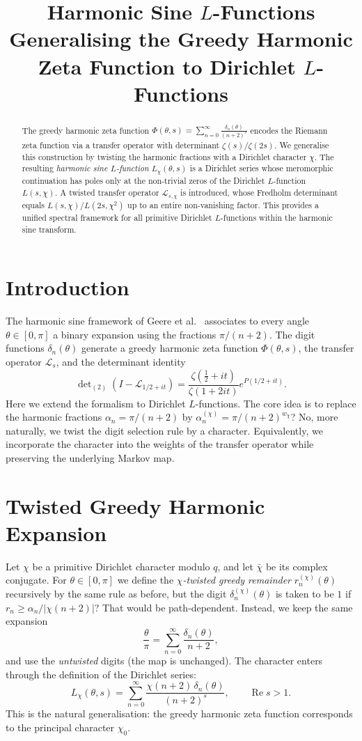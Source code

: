 \documentclass[11pt,a4paper]{article}
\title{\bfseries Harmonic Sine \(L\)-Functions\\
\large Generalising the Greedy Harmonic Zeta Function to Dirichlet \(L\)-Functions}
\author{}
\date{}
\begin{document}
\maketitle

\begin{abstract}
The greedy harmonic zeta function \(\Phi(\theta,s)=\sum_{n=0}^\infty \frac{\delta_n(\theta)}{(n+2)^s}\) encodes the Riemann zeta function via a transfer operator with determinant \(\zeta(s)/\zeta(2s)\).  We generalise this construction by twisting the harmonic fractions with a Dirichlet character \(\chi\).  The resulting \emph{harmonic sine \(L\)-function} \(L_{\chi}(\theta,s)\) is a Dirichlet series whose meromorphic continuation has poles only at the non‑trivial zeros of the Dirichlet \(L\)-function \(L(s,\chi)\).  A twisted transfer operator \(\mathcal{L}_{s,\chi}\) is introduced, whose Fredholm determinant equals \(L(s,\chi)/L(2s,\chi^2)\) up to an entire non‑vanishing factor.  This provides a unified spectral framework for all primitive Dirichlet \(L\)-functions within the harmonic sine transform.
\end{abstract}

\section{Introduction}
The harmonic sine framework of Geere et al.\ \cite{HST} associates to every angle \(\theta\in[0,\pi]\) a binary expansion using the fractions \(\pi/(n+2)\).  The digit functions \(\delta_n(\theta)\) generate a greedy harmonic zeta function \(\Phi(\theta,s)\), the transfer operator \(\mathcal{L}_s\), and the determinant identity
\[
\det\nolimits_{(2)}(I-\mathcal{L}_{1/2+it}) = \frac{\zeta(\tfrac12+it)}{\zeta(1+2it)} e^{P(1/2+it)} .
\]
Here we extend the formalism to Dirichlet \(L\)-functions.  The core idea is to replace the harmonic fractions \(\alpha_n = \pi/(n+2)\) by \(\alpha_n^{(\chi)} = \pi/(n+2)^{w_\chi}\)?  No, more naturally, we twist the digit selection rule by a character.  Equivalently, we incorporate the character into the weights of the transfer operator while preserving the underlying Markov map.

\section{Twisted Greedy Harmonic Expansion}
Let \(\chi\) be a primitive Dirichlet character modulo \(q\), and let \(\bar\chi\) be its complex conjugate.  For \(\theta\in[0,\pi]\) we define the \emph{\(\chi\)-twisted greedy remainder} \(r_n^{(\chi)}(\theta)\) recursively by the same rule as before, but the digit \(\delta_n^{(\chi)}(\theta)\) is taken to be \(1\) if \(r_n \ge \alpha_n / |\chi(n+2)|\)?  That would be path‑dependent.  Instead, we keep the same expansion
\[
\frac{\theta}{\pi} = \sum_{n=0}^\infty \frac{\delta_n(\theta)}{n+2},
\]
and use the \emph{untwisted} digits (the map is unchanged).  The character enters through the definition of the Dirichlet series:
\[
L_{\chi}(\theta,s) = \sum_{n=0}^\infty \frac{\chi(n+2)\,\delta_n(\theta)}{(n+2)^s},\qquad \operatorname{Re}s>1.
\label{eq:Lseries}
\]
This is the natural generalisation: the greedy harmonic zeta function corresponds to the principal character \(\chi_0\).
\end{document}
